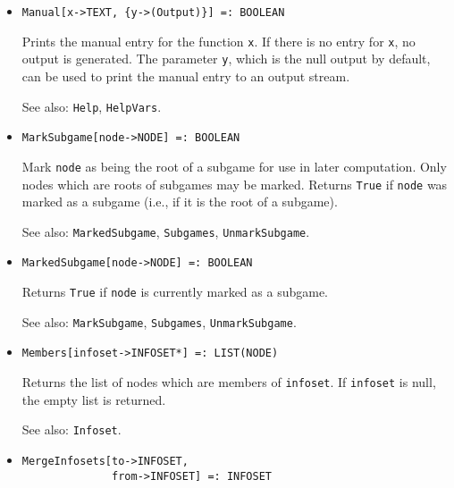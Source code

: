 \begin{itemize}

\item{}
\protect \large \begin{verbatim}
Manual[x->TEXT, {y->(Output)}] =: BOOLEAN 
\end{verbatim} \normalsize

\bd 
Prints the manual entry for the function \verb+x+.  If there is no
entry for \verb+x+, no output is generated. The parameter
\verb+y+, which is the null output by default, can be used to print
the manual entry to an output stream.
\item [See also:] \verb+Help+, \verb+HelpVars+.
\ed

\item{}
\protect \large \begin{verbatim}
MarkSubgame[node->NODE] =: BOOLEAN 
\end{verbatim} \normalsize

\bd
Mark \verb+node+ as being the root of a subgame for use in later computation.
Only nodes which are roots of subgames may be marked.  Returns \verb+True+
if \verb+node+ was marked as a subgame (i.e., if it is the root of a subgame).
\item [See also:] \verb+MarkedSubgame+, \verb+Subgames+,
\verb+UnmarkSubgame+.
\ed


\item{}
\protect \large \begin{verbatim}
MarkedSubgame[node->NODE] =: BOOLEAN 
\end{verbatim} \normalsize

\bd
Returns \verb+True+ if \verb+node+ is currently marked as a subgame. 
\item [See also:] \verb+MarkSubgame+, \verb+Subgames+, \verb+UnmarkSubgame+.
\ed


\item{}
\protect \large \begin{verbatim}
Members[infoset->INFOSET*] =: LIST(NODE) 
\end{verbatim}\normalsize

\bd
Returns the list of nodes which are members of \verb+infoset+.  If
\verb+infoset+ is null, the empty list is returned.
\item [See also:] \verb+Infoset+.
\ed

\item{}
\protect \large \begin{verbatim}
MergeInfosets[to->INFOSET,
              from->INFOSET] =: INFOSET
\end{verbatim}\normalsize


\end{itemize}
